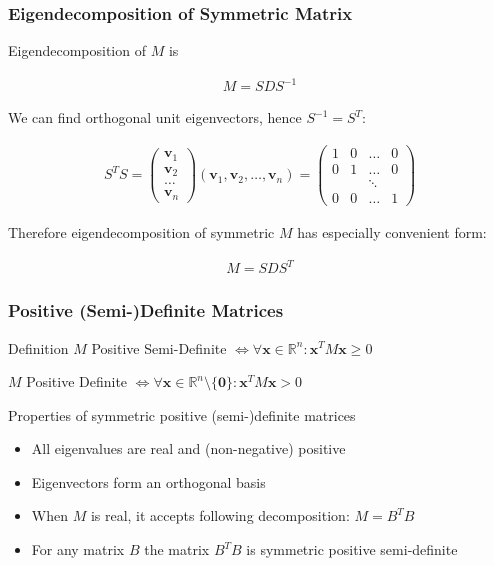 \documentclass[8pt]{beamer}
\begin{document}
\begin{frame}
\frametitle{Eigendecomposition of Symmetric Matrix}

Eigendecomposition of $M$ is

\begin{align*}
    M = S D S^{-1}
\end{align*}

We can find orthogonal unit eigenvectors, hence $S^{-1} = S^T$:

\begin{align*}
    S^T S = \begin{pmatrix}
    \mathbf{v}_1 \\
    \mathbf{v}_2 \\
    \dots \\
    \mathbf{v}_n
    \end{pmatrix} (\mathbf{v}_1, \mathbf{v}_2, \dots, \mathbf{v}_n) = \begin{pmatrix}
    1 & 0 & \dots & 0 \\
    0 & 1 & \dots & 0 \\
      &   & \ddots &  \\
    0 & 0 & \dots & 1
    \end{pmatrix}
\end{align*}

Therefore eigendecomposition of symmetric $M$ has especially convenient form:

\begin{align*}
    M = S D S^T
\end{align*}

\end{frame}


\begin{frame}
\frametitle{Positive (Semi-)Definite Matrices}

\begin{block}{Definition}
$M$ Positive Semi-Definite $\iff \forall \mathbf{x} \in \mathbb{R}^n : \mathbf{x}^T M \mathbf{x} \geq 0$

$M$ Positive Definite $\iff \forall \mathbf{x} \in \mathbb{R}^n \setminus \{\mathbf{0}\} : \mathbf{x}^T M \mathbf{x} > 0$
\end{block}

\begin{block}{Properties of symmetric positive (semi-)definite matrices}
\begin{itemize}
    \item All eigenvalues are real and (non-negative) positive
    \item Eigenvectors form an orthogonal basis
    \item When $M$ is real, it accepts following decomposition: $M = B^T B$
    \item For any matrix $B$ the matrix $B^T B$ is symmetric positive semi-definite
\end{itemize}
\end{block}
\end{frame}
\end{document}
